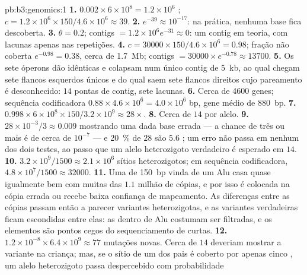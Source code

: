 \begin{solution}{pb:b3:genomics:1}
\textbf{1.} $0.002\times 6\times 10^{8} = 1.2\times 10^{6}$ ;
$c = 1.2\times 10^{6}\times 150/4.6\times 10^{6} \approx 39$.
\textbf{2.} $e^{-39} \approx 10^{-17}$: na prática, nenhuma base fica
descoberta.
\textbf{3.} $\theta = 0.2$; contigs $= 1.2\times 10^{6} e^{-31} \approx
0$: um contig em teoria, com lacunas apenas nas repetições.
\textbf{4.} $c = \num{30000}\times 150/4.6\times 10^{6} = 0.98$; fração
não coberta $e^{-0.98} = 0.38$, cerca de \qty{1.7}{Mb}; contigs $= \num{30000}
\times e^{-0.78} \approx \num{13700}$.
\textbf{5.} Os sete óperons dão  idênticas e colapsam num único
contig de \qty{5}{kb}, ao qual chegam sete flancos esquerdos únicos e do
qual saem sete flancos direitos cujo pareamento é desconhecido: $14$
pontas de contig, sete lacunas.
\textbf{6.} Cerca de \num{4600} genes; sequência codificadora
$0.88\times 4.6\times 10^{6}
= 4.0\times 10^{6}$ bp, gene médio de
\qty{880}{bp}.
\textbf{7.} $0.998\times 6\times 10^{8}\times 150/3.2\times 10^{9}
\approx 28\times$.
\textbf{8.} Cerca de $14$  por alelo.
\textbf{9.} $28\times 10^{-3}/3 \approx 0.009$  mostrando uma
dada base errada --- a chance de três ou mais é de cerca de $10^{-7}$
--- e \qty{20}{\%} de $28$ são $5.6$ ; um erro não passa em
nenhum dos dois testes, ao passo que um alelo heterozigoto verdadeiro é
esperado em $14$.
\textbf{10.} $3.2\times 10^{9}/1500 \approx 2.1\times 10^{6}$ sítios
heterozigotos; em sequência codificadora, $4.8\times 10^{7}/1500 \approx
\num{32000}$.
\textbf{11.} Uma  de \qty{150}{bp} vinda de um Alu casa quase
igualmente bem com muitas das $1.1$ milhão de cópias, e por isso é
colocada na cópia errada ou recebe baixa confiança de mapeamento. As
diferenças entre as cópias passam então a parecer variantes
heterozigotas, e as variantes verdadeiras ficam escondidas entre elas:
as  dentro de Alu costumam ser filtradas, e os
elementos são pontos cegos do sequenciamento de  curtas.
\textbf{12.} $1.2\times 10^{-8}\times 6.4\times 10^{9} \approx 77$
mutações novas. Cerca de $14$  deveriam mostrar a variante na
criança; mas, se o sítio de um dos pais é coberto por apenas cinco
, um alelo heterozigoto passa despercebido com probabilidade

\end{solution}
